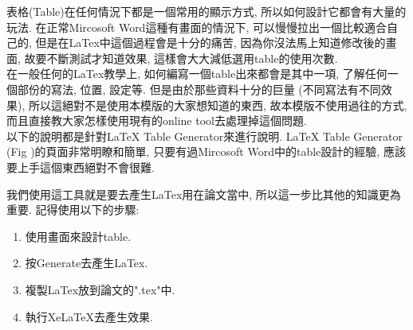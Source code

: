 
表格(Table)在任何情況下都是一個常用的顯示方式, 所以如何設計它都會有大量的玩法. 在正常Mircosoft Word這種有畫面的情況下, 可以慢慢拉出一個比較適合自己的, 但是在LaTex中這個過程會是十分的痛苦, 因為你沒法馬上知道修改後的畫面, 故要不斷測試才知道效果, 這樣會大大減低選用table的使用次數.\\

在一般任何的LaTex教學上, 如何編寫一個table出來都會是其中一項, 了解任何一個部份的寫法, 位置, 設定等. 但是由於那些資料十分的巨量 (不同寫法有不同效果), 所以這絕對不是使用本模版的大家想知道的東西, 故本模版不使用過往的方式, 而且直接教大家怎樣使用現有的online tool去處理掉這個問題.\\

以下的說明都是針對LaTeX Table Generator來進行說明. LaTeX Table Generator (Fig )的頁面非常明瞭和簡單, 只要有過Mircosoft Word中的table設計的經驗, 應該要上手這個東西絕對不會很難.


\newpage
{}

  我們使用這工具就是要去產生LaTex用在論文當中, 所以這一步比其他的知識更為重要. 記得使用以下的步驟:

  \begin{enumerate}
  \item
  {
    使用畫面來設計table.
  } %

  \item
  {
    按Generate去產生LaTex.
  } %

  \item
  {
    複製LaTex放到論文的".tex"中.
  } %

  \item
  {
    執行XeLaTeX去產生效果.
  } %
  \end{enumerate}

